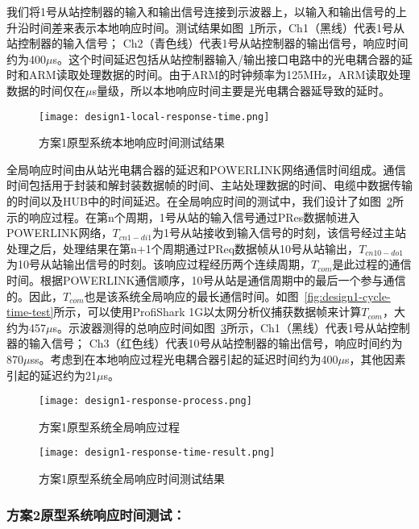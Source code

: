 我们将1号从站控制器的输入和输出信号连接到示波器上，以输入和输出信号的上升沿时间差来表示本地响应时间。测试结果如图~\ref{fig:design1-local-response-time}所示，Ch1（黑线）代表1号从站控制器的输入信号； Ch2（青色线）代表1号从站控制器的输出信号，响应时间约为400$\mu$s。这个时间延迟包括从站控制器输入/输出接口电路中的光电耦合器的延时和ARM读取处理数据的时间。由于ARM的时钟频率为125MHz，ARM读取处理数据的时间仅在$\mu$s量级，所以本地响应时间主要是光电耦合器延导致的延时。
\begin{figure}[!htb]
  \centering
  \texttt{[image: design1-local-response-time.png]}
  \caption{方案1原型系统本地响应时间测试结果}
  \label{fig:design1-local-response-time}
\end{figure}

全局响应时间由从站光电耦合器的延迟和POWERLINK网络通信时间组成。通信时间包括用于封装和解封装数据帧的时间、主站处理数据的时间、电缆中数据传输的时间以及HUB中的时间延迟。在全局响应时间的测试中，我们设计了如图~\ref{fig:design1-response-process}所示的响应过程。在第n个周期，1号从站的输入信号通过PRes数据帧进入POWERLINK网络，$T_{cn1-di1}$为1号从站接收到输入信号的时刻，该信号经过主站处理之后，处理结果在第n+1个周期通过PReq数据帧从10号从站输出，$T_{cn10-do1}$为10号从站输出信号的时刻。该响应过程经历两个连续周期，$T_{com}$是此过程的通信时间。根据POWERLINK通信顺序，10号从站是通信周期中的最后一个参与通信的。因此，$T_{com}$也是该系统全局响应的最长通信时间。如图~\ref{fig:design1-cycle-time-test}所示，可以使用ProfiShark 1G以太网分析仪捕获数据帧来计算$T_{com}$，大约为457$\mu$s。示波器测得的总响应时间如图~\ref{fig:design1-response-time-result}所示，Ch1（黑线）代表1号从站控制器的输入信号； Ch3（红色线）代表10号从站控制器的输出信号，响应时间约为870$\mu$ss。考虑到在本地响应过程光电耦合器引起的延迟时间约为400$\mu$s，其他因素引起的延迟约为21$\mu$s。

\begin{figure}[!htb]
  \centering
  \texttt{[image: design1-response-process.png]}
  \caption{方案1原型系统全局响应过程}
  \label{fig:design1-response-process}
\end{figure}

\begin{figure}[!htb]
  \centering
  \texttt{[image: design1-response-time-result.png]}
  \caption{方案1原型系统全局响应时间测试结果}
  \label{fig:design1-response-time-result}
\end{figure}

\subsubsection{方案2原型系统响应时间测试：}

